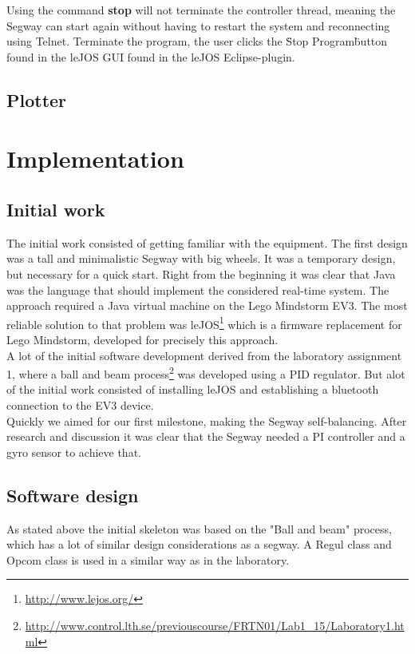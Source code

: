 \noindent Using the command \textbf{stop} will not terminate the controller thread, meaning the Segway can start again without having to restart the system and reconnecting using Telnet. Terminate the program, the user clicks the \"Stop Program\" button found in the leJOS GUI found in the leJOS Eclipse-plugin.

\subsection{Plotter}
  
\section{Implementation}
\subsection{Initial work}
The initial work consisted of getting familiar with the equipment. The first design was a tall and minimalistic Segway with big wheels. It was a temporary design, but necessary for a quick start. Right from the beginning it was clear that Java was the language that should implement the considered real-time system. The approach required a Java virtual machine on the Lego Mindstorm EV3. The most reliable solution to that problem was leJOS\footnote{\url{http://www.lejos.org/}} which is a firmware replacement for Lego Mindstorm, developed for precisely this approach. 
\\[3ex]
A lot of the initial software development derived from the laboratory assignment 1, where a ball and beam process\footnote{\url{http://www.control.lth.se/previouscourse/FRTN01/Lab1_15/Laboratory1.html}} was developed using a PID regulator. But alot of the initial work consisted of installing leJOS and establishing a bluetooth connection to the EV3 device. 
\\[3ex]
Quickly we aimed for our first milestone, making the Segway self-balancing. After research and discussion it was clear that the Segway needed a PI controller and a gyro sensor to achieve that. 

\subsection{Software design}

As stated above the initial skeleton was based on the "Ball and beam" process, which has a lot of similar design considerations as a segway. A Regul class and Opcom class is used in a similar way as in the laboratory.

